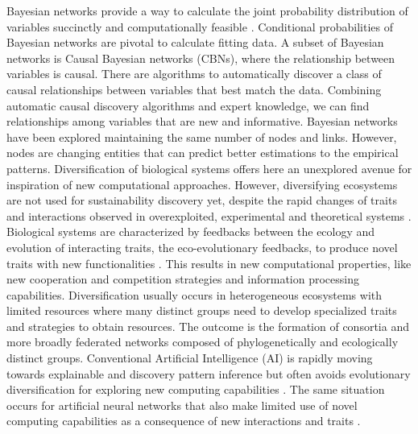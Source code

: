 \documentclass[12pt,a4paper]{article}
\begin{document}
Bayesian networks provide a way to calculate the joint probability distribution of variables succinctly and computationally feasible \citep{pearl2011bayesian}. Conditional probabilities of Bayesian networks are pivotal to calculate fitting data. A subset of Bayesian networks is Causal Bayesian networks (CBNs), where the relationship between variables is causal. There are algorithms to automatically discover a class of causal relationships between variables that best match the data. Combining automatic causal discovery algorithms and expert knowledge, we can find relationships among variables that are new and informative. Bayesian networks have been explored maintaining the same number of nodes and links. However, nodes are changing entities that can predict better estimations to the empirical patterns. Diversification of biological systems offers here an unexplored avenue for inspiration of new computational approaches. However, diversifying ecosystems are not used for sustainability discovery yet, despite the rapid changes of traits and interactions observed in overexploited, experimental and theoretical systems \citep{Hairston2005, Walsh2006, Fussmann2007, Trugman8532}. Biological systems are characterized by feedbacks between the ecology and evolution of interacting traits, the eco-evolutionary feedbacks, to produce novel traits with new functionalities \citep{Govaertetal2019}. This results in new computational properties, like new cooperation and competition strategies and information processing capabilities. Diversification usually occurs in heterogeneous ecosystems with limited resources where many distinct groups need to develop specialized traits and strategies to obtain resources. The outcome is the formation of consortia and more broadly federated networks composed of phylogenetically and ecologically distinct groups. Conventional Artificial Intelligence (AI) is rapidly moving towards explainable and discovery pattern inference \citep{Iten2020a} but often avoids evolutionary diversification for exploring new computing capabilities \citep{Real2020}. The same situation occurs for artificial neural networks that also make limited use of novel computing capabilities as a consequence of new interactions and traits \citep{Schmidhuber:2015}.
\end{document}
